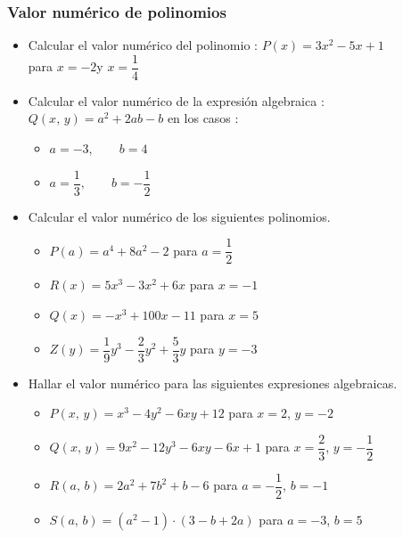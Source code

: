 \documentclass[10pt, twocolumn, landscape, a4paper]{article}
\begin{document}
\subsubsection*{Valor numérico de polinomios}
\begin{itemize}
\item{Calcular el valor numérico del polinomio : \quad$P(x) = 3x^2 - 5x + 1$ \\ para $x = -2$\quad y \quad$x = \dfrac1{4}$}
\item{Calcular el valor numérico de la expresión algebraica : $Q(x,\,y) = a^2 + 2ab - b$ en los casos : 
\begin{itemize}
\item{$a = -3,\qquad b = 4$}
\item{$a = \dfrac1{3},\qquad b = -\dfrac1{2}$}
\end{itemize}
}
\item{Calcular el valor numérico de los siguientes polinomios.
\begin{itemize}
\item{$P(a) = a^4 + 8a^2 - 2$ \qquad para \quad$a = \dfrac1{2}$}
\item{$R(x) = 5x^3 - 3x^2 + 6x$ \qquad para \quad$x = -1$}
\item{$Q(x) = -x^3 + 100x - 11$ \qquad para \quad$x = 5$}
\item{$Z(y) = \dfrac{1}{9}y^3 - \dfrac{2}{3}y^2 + \dfrac{5}{3}y$ \qquad para \quad$y = -3$}
\end{itemize}
}
\item{Hallar el valor numérico para las siguientes expresiones algebraicas.
\begin{itemize}
\item{$P(x,\,y) = x^3 - 4y^2 - 6xy + 12$ \qquad para \quad$x = 2$, \quad$y = -2$}
\item{$Q(x,\,y) = 9x^2 - 12y^3 - 6xy - 6x + 1$ \qquad para \quad$x = \dfrac{2}{3}$, \quad$y = -\dfrac{1}{2}$}
\item{$R(a,\,b) = 2a^2 + 7b^2 + b - 6$ \qquad para \quad$a = -\dfrac1{2}$, \quad$b = -1$}
\item{$S(a,\,b) = (a^2 - 1) \cdot (3 - b + 2a)$ \qquad para \quad$a = -3$, \quad$b = 5$}
\end{itemize}
}

\end{itemize}
\end{document}
